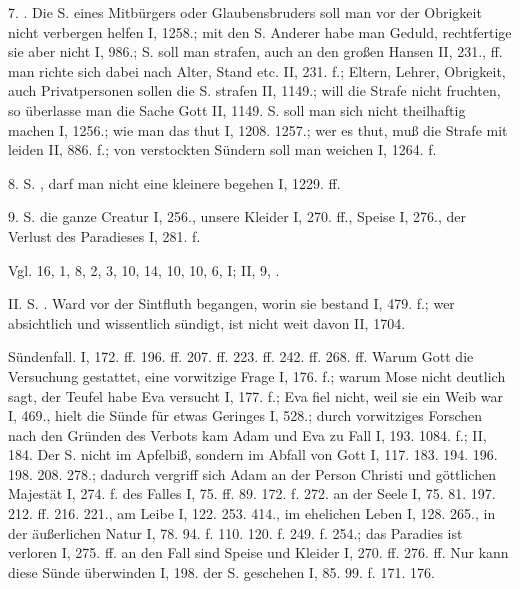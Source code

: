 7. . Die S. eines Mitbürgers oder Glaubensbruders soll man vor der Obrigkeit nicht verbergen helfen I, 1258.; mit den S. Anderer habe man Geduld, rechtfertige sie aber nicht I, 986.; S. soll man strafen, auch an den großen Hansen II, 231., ff. man richte sich dabei nach Alter, Stand etc. II, 231. f.; Eltern, Lehrer, Obrigkeit, auch Privatpersonen sollen die S. strafen II, 1149.; will die Strafe nicht fruchten, so überlasse man die Sache Gott II, 1149.  S. soll man sich nicht theilhaftig machen I, 1256.; wie man das thut I, 1208. 1257.; wer es thut, muß die Strafe mit leiden II, 886. f.; von verstockten Sündern soll man weichen I, 1264. f.

8.  S. , darf man nicht eine kleinere begehen I, 1229. ff.

9.  S.  die ganze Creatur I, 256., unsere Kleider I, 270. ff., Speise I, 276., der Verlust des Paradieses I, 281. f.

Vgl.  16,  1,  8,  2, 3,  10,  14,  10,  10,  6,  I; II, 9, .

II. S. . Ward vor der Sintfluth begangen, worin sie bestand I, 479. f.; wer absichtlich und wissentlich sündigt, ist nicht weit davon II, 1704.

Sündenfall. I, 172. ff. 196. ff. 207. ff. 223. ff. 242. ff. 268. ff. Warum Gott die Versuchung gestattet, eine vorwitzige Frage I, 176. f.; warum Mose nicht deutlich sagt, der Teufel habe Eva versucht I, 177. f.; Eva fiel nicht, weil sie ein Weib war I, 469., hielt die Sünde für etwas Geringes I, 528.; durch vorwitziges Forschen nach den Gründen des Verbots kam Adam und Eva zu Fall I, 193. 1084. f.; II, 184. Der S.  nicht im Apfelbiß, sondern im Abfall von Gott I, 117. 183. 194. 196. 198. 208. 278.; dadurch vergriff sich Adam an der Person Christi und göttlichen Majestät I, 274. f.  des Falles I, 75. ff. 89. 172. f. 272. an der Seele I, 75. 81. 197. 212. ff. 216. 221., am Leibe I, 122. 253. 414., im ehelichen Leben I, 128. 265., in der äußerlichen Natur I, 78. 94. f. 110. 120. f. 249. f. 254.; das Paradies ist verloren I, 275. ff.  an den Fall sind Speise und Kleider I, 270. ff. 276. ff. Nur  kann diese Sünde überwinden I, 198.  der S. geschehen I, 85. 99. f. 171. 176.

